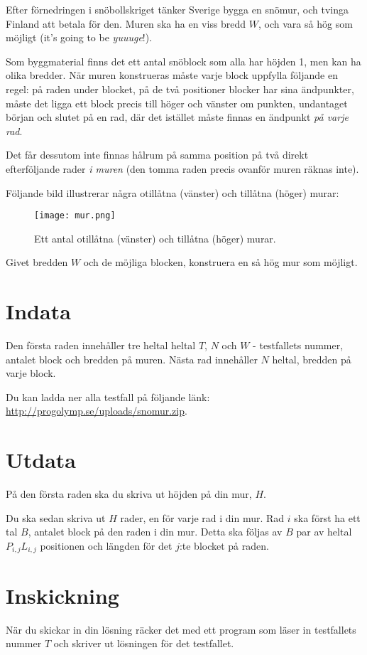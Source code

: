 Efter förnedringen i snöbollskriget tänker Sverige bygga en snömur, och tvinga Finland att betala för den.
Muren ska ha en viss bredd $W$, och vara så hög som möjligt (it's going to be \emph{yuuuge}!).

Som byggmaterial finns det ett antal snöblock som alla har höjden 1, men kan ha olika bredder.
När muren konstrueras måste varje block uppfylla följande en regel: på raden under blocket,
på de två positioner blocker har sina ändpunkter, måste det ligga ett block precis till höger och vänster om punkten,
undantaget början och slutet på en rad, där det istället måste finnas en ändpunkt \emph{på varje rad}.

Det får dessutom inte finnas hålrum på samma position på två direkt efterföljande rader \emph{i muren} (den tomma raden
precis ovanför muren räknas inte).

Följande bild illustrerar några otillåtna (vänster) och tillåtna (höger) murar:

\begin{figure}[h]
	\centering
	\texttt{[image: mur.png]}
	\caption{Ett antal otillåtna (vänster) och tillåtna (höger) murar.}
\end{figure}

Givet bredden $W$ och de möjliga blocken, konstruera en så hög mur som möjligt.

\section*{Indata}
Den första raden innehåller tre heltal heltal $T$, $N$ och $W$ - testfallets nummer, antalet block och bredden på muren.
Nästa rad innehåller $N$ heltal, bredden på varje block.

Du kan ladda ner alla testfall på följande länk: \url{http://progolymp.se/uploads/snomur.zip}.

\section*{Utdata}
På den första raden ska du skriva ut höjden på din mur, $H$.

Du ska sedan skriva ut $H$ rader, en för varje rad i din mur.
Rad $i$ ska först ha ett tal $B$, antalet block på den raden i din mur.
Detta ska följas av $B$ par av heltal $P_{i,j} L_{i,j}$ positionen och längden för det $j$:te blocket på raden.

\section*{Inskickning}
När du skickar in din lösning räcker det med ett program som läser in testfallets nummer $T$ och skriver ut lösningen för det testfallet.

